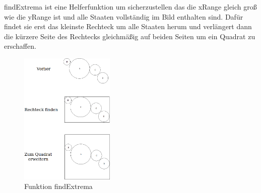 findExtrema ist eine Helferfunktion um sicherzustellen das die xRange gleich groß wie die yRange ist und alle Staaten vollständig im Bild enthalten sind.
Dafür findet sie erst das kleinste Rechteck um alle Staaten herum und verlängert dann die kürzere Seite des Rechtecks gleichmäßig auf beiden Seiten um ein Quadrat zu erschaffen.

\begin{figure}[htb]
    \centering
    \includegraphics[width=0.4\textwidth,]{findExtrema.png}
    \caption[]{Funktion findExtrema}
\end{figure}
